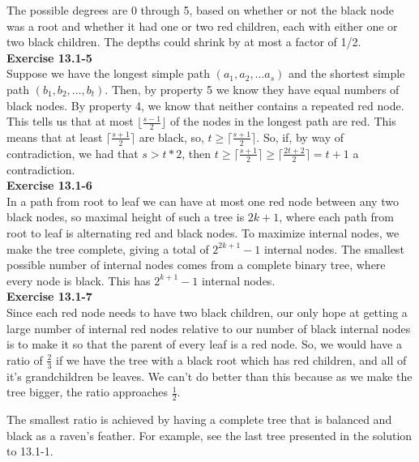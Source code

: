 \documentclass{article}
\begin{document}
The possible degrees are 0 through 5, based on whether or not the black node was a root and whether it had one or two red children, each with either one or two black children. The depths could shrink by at most a factor of 1/2. \\

\noindent\textbf{ Exercise 13.1-5} \\

Suppose we have the longest simple path $(a_1,a_2,\ldots a_s)$ and the shortest simple path $(b_1,b_2, \ldots, b_t)$. Then, by property 5 we know they have equal numbers of black nodes. By property 4, we know that neither contains a repeated red node. This tells us that at most $\lfloor\frac{s-1}{2}\rfloor$ of the nodes in the longest path are red. This means that at least $\lceil \frac{s+1}{2} \rceil$ are black, so, $t\ge \lceil \frac{s+1}{2} \rceil$. So, if, by way of contradiction, we had that $s>t*2$, then $  t \ge \lceil \frac{s+1}{2} \rceil \ge \lceil\frac{2t+2}{2} \rceil = t+1$ a contradiction.\\

\noindent\textbf{Exercise 13.1-6}\\

In a path from root to leaf we can have at most one red node between any two black nodes, so maximal height of such a tree is $2k+1$, where each path from root to leaf is alternating red and black nodes. To maximize internal nodes, we make the tree complete, giving a total of $2^{2k+1} - 1$ internal nodes. The smallest possible number of internal nodes comes from a complete binary tree, where every node is black.  This has $2^{k+1} - 1$ internal nodes. \\

\noindent\textbf{ Exercise 13.1-7} \\

Since each red node needs to have two black children, our only hope at getting a large number of internal red nodes relative to our number of black internal nodes is to make it so that the parent of every leaf is a red node. So, we would have a ratio of $\frac{2}{3}$ if we have the tree with a black root which has red children, and all of it's grandchildren be leaves. We can't do better than this because as we make the tree bigger, the ratio approaches $\frac{1}{2}$.

The smallest ratio is achieved by having a complete tree that is balanced and black as a raven's feather. For example, see the last tree presented in the solution to 13.1-1. \\
\end{document}
